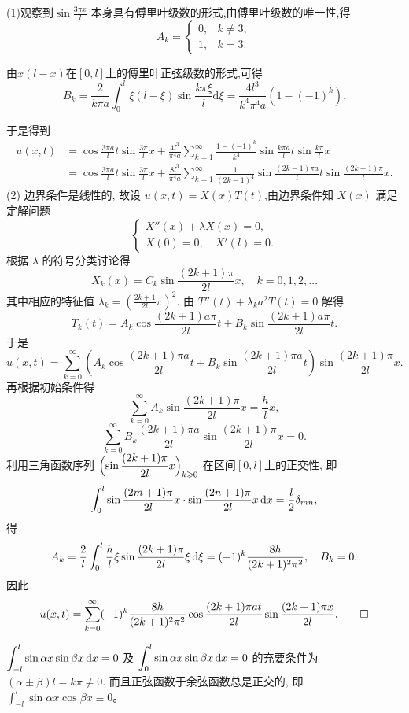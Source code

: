 \begin{solve}
	(1)观察到$\displaystyle\sin\frac{3\pi x}l$ 本身具有傅里叶级数的形式,由傅里叶级数的唯一性,得
	$$A_k=\begin{cases}0,&k\neq3,\\1,&k=3.\end{cases}$$
	
	由$x(l-x)$在$[0,l]$上的傅里叶正弦级数的形式,可得
	$$B_k=\frac2{k\pi a}\int_0^l\xi(l-\xi)\sin\frac{k\pi \xi}l\mathrm{d}\xi=\frac{4l^3}{k^4\pi^4a}(1-(-1)^k).$$
	
	于是得到
	$$\begin{aligned}
		u(x,t)&=\cos\frac{3\pi a}lt\sin\frac{3\pi }lx+\frac{4l^3}{\pi^4a}\sum_{k=1}^\infty\frac{1-(-1)^k}{k^4}\sin\frac{k\pi a}lt\sin\frac{k\pi}lx\\
		&=\cos\frac{3\pi a}lt\sin\frac{3\pi }lx+\frac{8l^3}{\pi^4a}\sum_{k=1}^\infty\frac{1}{(2k-1)^4}\sin\frac{(2k-1)\pi a}lt\sin\frac{(2k-1)\pi}lx.
	\end{aligned}$$
  (2) 边界条件是线性的, 故设 $u(x,t)=X(x)T(t)$,由边界条件知 $X(x)$ 满足定解问题
  \[\begin{cases}
    X''(x)+\lambda X(x) = 0, \\
    X(0) = 0,\quad X'(l) = 0.
  \end{cases}\]
  根据 $\lambda$ 的符号分类讨论得
  \[X_k(x)=C_k\sin \frac{(2k+1)\pi}{2l}x,\quad k=0,1,2,\ldots\]
  其中相应的特征值 $\displaystyle\lambda_k=\left(\frac{2k+1}{2l}\pi\right)^2$.
  由 $T''(t)+\lambda_k a^2T(t)=0$ 解得
  \[T_k(t) = A_k\cos\frac{(2k+1)a\pi}{2l}t+B_k\sin \frac{(2k+1)a\pi}{2l}t.\]
  于是
  \[u(x,t) = \sum_{k=0}^{\infty}\left(A_k\cos\frac{(2k+1)\pi a}{2l}t
    + B_k\sin \frac{(2k+1)\pi a}{2l}t\right)\sin \frac{(2k+1)\pi}{2l}x.\]
  再根据初始条件得
  \[\sum_{k=0}^{\infty}A_k\sin \frac{(2k+1)\pi}{2l}x=\frac{h}{l}x,\]
  \[\sum_{k=0}^{\infty}B_k\frac{(2k+1)\pi a}{2l}\sin \frac{(2k+1)\pi}{2l}x = 0.\]
  利用三角函数序列 $\displaystyle\Bigl(\sin \frac{(2k+1)\pi}{2l}x\Bigr)_{k\geq 0}$
  在区间$[0,l]$上的正交性, 即
  \[\int_0^l\sin \frac{(2m+1)\pi}{2l}x\cdot\sin \frac{(2n+1)\pi}{2l}x\diff x
    = \frac{l}{2}\delta_{mn},\]
  得
  \[A_k=\frac{2}{l}\int_0^l\frac{h}{l}\xi\sin \frac{(2k+1)\pi}{2l}\xi\diff \xi
    =(-1)^k\frac{8h}{(2k+1)^2\pi^2},\quad B_k = 0.\]
  因此
  \[ u(x,t) = \sum_{k=0}^{\infty}(-1)^k\frac{8h}{(2k+1)^2\pi^2}\cos\frac{(2k+1)\pi at}{2l}
    \sin\frac{(2k+1)\pi x}{2l}. \qedhere \]
\end{solve}

\begin{remark}
  $\displaystyle\int_{-l}^l\sin\alpha x\sin\beta x\diff x=0$ 及 $\displaystyle\int_0^l\sin\alpha x\sin\beta x\diff x=0$
  的充要条件为 $(\alpha\pm\beta)l=k\pi\neq 0$. 而且正弦函数于余弦函数总是正交的, 
  即 $\displaystyle\int_{-l}^l\sin\alpha x\cos\beta x\equiv 0$。
\end{remark}


